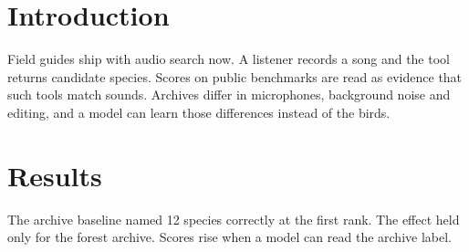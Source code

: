 \begin{abstract}
Song libraries are searched by people who need to name a bird from a field recording. We ask whether retrieval scores on such a library measure matching sounds to species or only matching recordings to the archive they came from. We built a small benchmark of forty recordings and tested three audio models against a baseline that sees only the archive label. One model beat that baseline, and only on a minority of queries.
\end{abstract}
\section{Introduction}
Field guides ship with audio search now. A listener records a song and the tool returns candidate species. Scores on public benchmarks are read as evidence that such tools match sounds. Archives differ in microphones, background noise and editing, and a model can learn those differences instead of the birds.
\section{Results}
The archive baseline named 12 species correctly at the first rank. The effect held only for the forest archive. Scores rise when a model can read the archive label.
